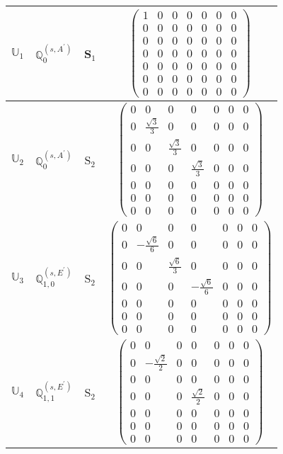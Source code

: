 \documentclass[fleqn,10pt,landscape]{article}
\begin{document}
\begin{itemize}
\begin{center}
\begin{longtable}{c|c|c|c}
$ \mathbb{U}_{1} $ & $\mathbb{Q}_{0}^{(s,A^{\prime})}$ & S$_{1}$ & $\begin{pmatrix} 1 & 0 & 0 & 0 & 0 & 0 & 0 \\ 0 & 0 & 0 & 0 & 0 & 0 & 0 \\ 0 & 0 & 0 & 0 & 0 & 0 & 0 \\ 0 & 0 & 0 & 0 & 0 & 0 & 0 \\ 0 & 0 & 0 & 0 & 0 & 0 & 0 \\ 0 & 0 & 0 & 0 & 0 & 0 & 0 \\ 0 & 0 & 0 & 0 & 0 & 0 & 0 \end{pmatrix}$ \\ \hline
$ \mathbb{U}_{2} $ & $\mathbb{Q}_{0}^{(s,A^{\prime})}$ & S$_{2}$ & $\begin{pmatrix} 0 & 0 & 0 & 0 & 0 & 0 & 0 \\ 0 & \frac{\sqrt{3}}{3} & 0 & 0 & 0 & 0 & 0 \\ 0 & 0 & \frac{\sqrt{3}}{3} & 0 & 0 & 0 & 0 \\ 0 & 0 & 0 & \frac{\sqrt{3}}{3} & 0 & 0 & 0 \\ 0 & 0 & 0 & 0 & 0 & 0 & 0 \\ 0 & 0 & 0 & 0 & 0 & 0 & 0 \\ 0 & 0 & 0 & 0 & 0 & 0 & 0 \end{pmatrix}$ \\
$ \mathbb{U}_{3} $ & $\mathbb{Q}_{1,0}^{(s,E^{\prime})}$ & S$_{2}$ & $\begin{pmatrix} 0 & 0 & 0 & 0 & 0 & 0 & 0 \\ 0 & - \frac{\sqrt{6}}{6} & 0 & 0 & 0 & 0 & 0 \\ 0 & 0 & \frac{\sqrt{6}}{3} & 0 & 0 & 0 & 0 \\ 0 & 0 & 0 & - \frac{\sqrt{6}}{6} & 0 & 0 & 0 \\ 0 & 0 & 0 & 0 & 0 & 0 & 0 \\ 0 & 0 & 0 & 0 & 0 & 0 & 0 \\ 0 & 0 & 0 & 0 & 0 & 0 & 0 \end{pmatrix}$ \\
$ \mathbb{U}_{4} $ & $\mathbb{Q}_{1,1}^{(s,E^{\prime})}$ & S$_{2}$ & $\begin{pmatrix} 0 & 0 & 0 & 0 & 0 & 0 & 0 \\ 0 & - \frac{\sqrt{2}}{2} & 0 & 0 & 0 & 0 & 0 \\ 0 & 0 & 0 & 0 & 0 & 0 & 0 \\ 0 & 0 & 0 & \frac{\sqrt{2}}{2} & 0 & 0 & 0 \\ 0 & 0 & 0 & 0 & 0 & 0 & 0 \\ 0 & 0 & 0 & 0 & 0 & 0 & 0 \\ 0 & 0 & 0 & 0 & 0 & 0 & 0 \end{pmatrix}$ \\ \hline

\end{longtable}
\end{center}
\end{itemize}
\end{document}
